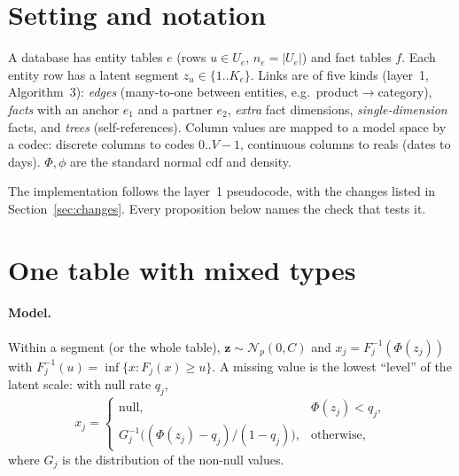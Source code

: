 \documentclass[11pt,a4paper]{article}
\theoremstyle{definition}
\theoremstyle{remark}
\begin{document}
\tableofcontents

\section{Setting and notation}\label{sec:setting}
A database has entity tables $e$ (rows $u\in U_e$, $n_e=|U_e|$) and fact tables $f$. Each entity row has a latent segment $z_u\in\{1..K_e\}$. Links are of five kinds (layer~1, Algorithm~3): \emph{edges} (many-to-one between entities, e.g.\ product$\to$category), \emph{facts} with an anchor $e_1$ and a partner $e_2$, \emph{extra} fact dimensions, \emph{single-dimension} facts, and \emph{trees} (self-references). Column values are mapped to a model space by a codec: discrete columns to codes $0..V-1$, continuous columns to reals (dates to days). $\Phi,\phi$ are the standard normal cdf and density.

The implementation follows the layer~1 pseudocode, with the changes listed in Section~\ref{sec:changes}. Every proposition below names the check that tests it.

\section{One table with mixed types}\label{sec:single}

\paragraph{Model.} Within a segment (or the whole table), $\mathbf z\sim\mathcal N_p(0,C)$ and $x_j=F_j^{-1}(\Phi(z_j))$ with $F_j^{-1}(u)=\inf\{x:F_j(x)\ge u\}$. A missing value is the lowest ``level'' of the latent scale: with null rate $q_j$,
\begin{equation}\label{eq:nullmap}
x_j=\begin{cases}\text{null}, & \Phi(z_j)<q_j,\\ G_j^{-1}\!\big((\Phi(z_j)-q_j)/(1-q_j)\big), & \text{otherwise,}\end{cases}
\end{equation}
where $G_j$ is the distribution of the non-null values.
\end{document}
